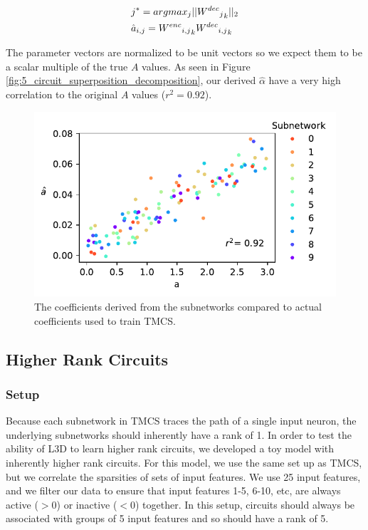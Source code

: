 \documentclass{article}
\theoremstyle{plain}
\theoremstyle{definition}
\theoremstyle{remark}
\begin{document}
\begin{align}
    &j^* = argmax_{j} ||{{{W^{dec}}_j}_k}||_2 \\
    &\hat{a}_{i,j} = {{{W^{enc}}_{i,j}}}_k {{W^{dec}}_{i,j}}_k \notag
\end{align}

The parameter vectors are normalized to be unit vectors so we expect them to be a scalar multiple of the true $A$ values. As seen in Figure \ref{fig:5_circuit_superposition_decomposition}, our derived $\hat{\alpha}$ have a very high correlation to the original $A$ values ($r^2 = 0.92$).



\begin{figure}[htbp]
    \centerline{\includegraphics[width=\columnwidth]{../figures/6_circuit_superposition_coefficients.pdf}}
    \centering
    \caption{The coefficients derived from the subnetworks compared to actual coefficients used to train TMCS.}\label{fig:6_circuit_superposition_coefficients}
\end{figure}


\subsection{Higher Rank Circuits}

\subsubsection{Setup}
Because each subnetwork in TMCS traces the path of a single input neuron, the underlying subnetworks should inherently have a rank of 1. In order to test the ability of L3D to learn higher rank circuits, we developed a toy model with inherently higher rank circuits. For this model, we use the same set up as TMCS, but we correlate the sparsities of sets of input features. We use 25 input features, and we filter our data to ensure that input features 1-5, 6-10, etc, are always active ($>0$) or inactive ($<0$) together. In this setup, circuits should always be associated with groups of 5 input features and so should have a rank of 5.
\end{document}
